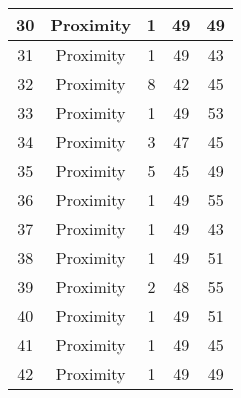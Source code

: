 \documentclass[results.tex]{subfiles}
\begin{document}
\begin{center}
\begin{tabular}{| c || c | c | c | c |}
            \hline
            30                      & Proximity                    & 1                      & 49                      & 49                   \\
            \hline
            31                      & Proximity                    & 1                      & 49                      & 43                   \\
            \hline
            32                      & Proximity                    & 8                      & 42                      & 45                   \\
            \hline
            33                      & Proximity                    & 1                      & 49                      & 53                   \\
            \hline
            34                      & Proximity                    & 3                      & 47                      & 45                   \\
            \hline
            35                      & Proximity                    & 5                      & 45                      & 49                   \\
            \hline
            36                      & Proximity                    & 1                      & 49                      & 55                   \\
            \hline
            37                      & Proximity                    & 1                      & 49                      & 43                   \\
            \hline
            38                      & Proximity                    & 1                      & 49                      & 51                   \\
            \hline
            39                      & Proximity                    & 2                      & 48                      & 55                   \\
            \hline
            40                      & Proximity                    & 1                      & 49                      & 51                   \\
            \hline
            41                      & Proximity                    & 1                      & 49                      & 45                   \\
            \hline
            42                      & Proximity                    & 1                      & 49                      & 49                   \\

\end{tabular}
\end{center}
\end{document}
